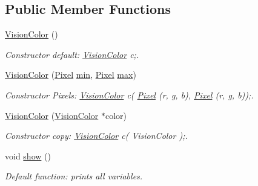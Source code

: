 \subsection*{Public Member Functions}
\begin{DoxyCompactItemize}
\item 
\hyperlink{structcommon_1_1VisionColor_a5c458feb1d92c624dff7e83a4bfa50e5}{Vision\+Color} ()\hypertarget{structcommon_1_1VisionColor_a5c458feb1d92c624dff7e83a4bfa50e5}{}\label{structcommon_1_1VisionColor_a5c458feb1d92c624dff7e83a4bfa50e5}

\begin{DoxyCompactList}\small\item\em Constructor default\+: \hyperlink{structcommon_1_1VisionColor}{Vision\+Color} c;. \end{DoxyCompactList}\item 
\hyperlink{structcommon_1_1VisionColor_a3552e22bbdf84cecdcfbe39d729be767}{Vision\+Color} (\hyperlink{structcommon_1_1Pixel}{Pixel} \hyperlink{structcommon_1_1VisionColor_a3a8a40c24233df23f44510fce5846aaf}{min}, \hyperlink{structcommon_1_1Pixel}{Pixel} \hyperlink{structcommon_1_1VisionColor_adc2c9c3c09c9694f7ce8e9c8d94407bd}{max})\hypertarget{structcommon_1_1VisionColor_a3552e22bbdf84cecdcfbe39d729be767}{}\label{structcommon_1_1VisionColor_a3552e22bbdf84cecdcfbe39d729be767}

\begin{DoxyCompactList}\small\item\em Constructor Pixels\+: \hyperlink{structcommon_1_1VisionColor}{Vision\+Color} c( \hyperlink{structcommon_1_1Pixel}{Pixel} (r, g, b), \hyperlink{structcommon_1_1Pixel}{Pixel} (r, g, b));. \end{DoxyCompactList}\item 
\hyperlink{structcommon_1_1VisionColor_a547481e4da9d02d44c2687c36a7de4b9}{Vision\+Color} (\hyperlink{structcommon_1_1VisionColor}{Vision\+Color} $\ast$color)\hypertarget{structcommon_1_1VisionColor_a547481e4da9d02d44c2687c36a7de4b9}{}\label{structcommon_1_1VisionColor_a547481e4da9d02d44c2687c36a7de4b9}

\begin{DoxyCompactList}\small\item\em Constructor copy\+: \hyperlink{structcommon_1_1VisionColor}{Vision\+Color} c( Vision\+Color );. \end{DoxyCompactList}\item 
void \hyperlink{structcommon_1_1VisionColor_ab566eab8f4f6dda505e423bdaffc7d27}{show} ()\hypertarget{structcommon_1_1VisionColor_ab566eab8f4f6dda505e423bdaffc7d27}{}\label{structcommon_1_1VisionColor_ab566eab8f4f6dda505e423bdaffc7d27}

\begin{DoxyCompactList}\small\item\em Default function\+: prints all variables. \end{DoxyCompactList}\end{DoxyCompactItemize}
